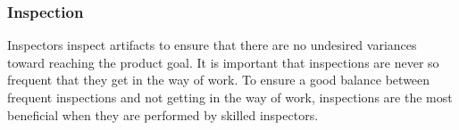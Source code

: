 \subsubsection{Inspection}


Inspectors inspect artifacts to ensure that there are no undesired variances toward reaching the product goal\cite{scrumguide11}. It is important that inspections are never so frequent that they get in the way of work\cite{scrumguide11}. To ensure a good balance between frequent inspections and not getting in the way of work, inspections are the most beneficial when they are performed by skilled inspectors\cite{scrumguide11}.